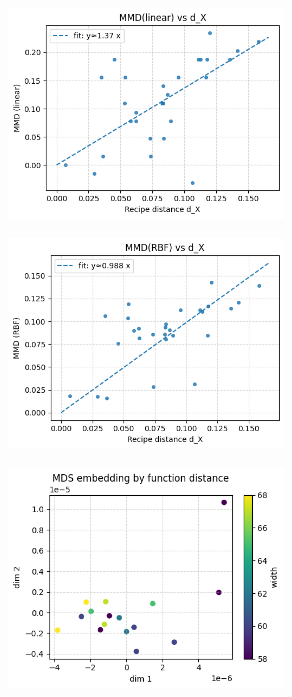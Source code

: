 \documentclass[12pt]{article}
\begin{document}
\begin{figure}[h]
    \centering
    \includegraphics[width=0.65\textwidth]{figures/A5/local continuity/linear kernel vs function distance.png}
\end{figure}

\begin{figure}[h]
    \centering
    \includegraphics[width=0.65\textwidth]{figures/A5/local continuity/rbf kernel vs function distance.png}
\end{figure}

\begin{figure}[h]
    \centering
    \includegraphics[width=0.65\textwidth]{figures/A5/local continuity/mds embedding by function distance.png}
\end{figure}
\end{document}
